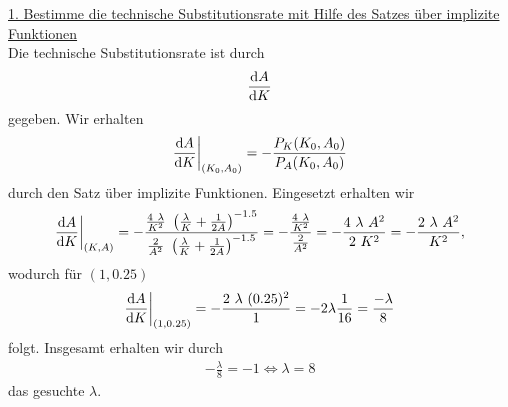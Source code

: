 \underline{1. Bestimme die technische Substitutionsrate mit Hilfe des Satzes über implizite Funktionen}\\
Die technische Substitutionsrate ist durch
\begin{align*}
\frac{\text{\rmfamily d} A}{\text{\rmfamily d} K}
\end{align*}
gegeben. Wir erhalten
\begin{align*}
\frac{\text{\rmfamily d} A}{\text{\rmfamily d} K} \bigg|_{(K_0,A_0)} =
-\frac{P_K(K_0,A_0)}{P_A(K_0,A_0)} 
\end{align*}
durch den Satz über implizite Funktionen. 
Eingesetzt erhalten wir 
\begin{align*}
\frac{\text{\rmfamily d} A}{\text{\rmfamily d} K} \bigg|_{(K,A)}
= 
-\frac{\frac{4 \ \lambda}{K^2} \  \left( \frac{\lambda}{K} +\frac{1}{2A} \right)^{-1.5}}{\frac{2}{ A^2} \ \left( \frac{\lambda}{K} +\frac{1}{2A} \right)^{-1.5}}
= -\frac{\frac{4 \ \lambda}{K^2}}{\frac{2}{A^2}}
= -\frac{4 \ \lambda \ A^2}{2 \ K^2}
= -\frac{2 \ \lambda \ A^2}{K^2},
\end{align*}
wodurch für $(1,0.25)$
\begin{align*}
\frac{\text{\rmfamily d} A}{\text{\rmfamily d} K} \bigg|_{(1,0.25)}
= -\frac{2 \ \lambda \ (0.25)^2}{1}
= -2 \lambda\frac{1}{16}
= \frac{-\lambda}{8}
\end{align*}
folgt. Insgesamt erhalten wir durch 
\begin{align*}
-\frac{\lambda}{8} = -1
\Leftrightarrow
\lambda = 8
\end{align*}
das gesuchte $\lambda$.

\newpage